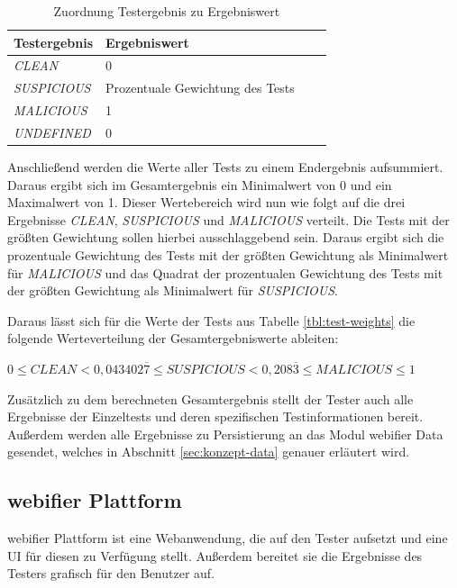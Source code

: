 \begin{table}[H]
\centering
\begin{tabular}{|l|l|l|l|}
\hline
\textbf{Testergebnis} & \textbf{Ergebniswert}\\\hline
\textit{CLEAN} & 0\\\hline
\textit{SUSPICIOUS} & Prozentuale Gewichtung des Tests\\\hline
\textit{MALICIOUS} & 1\\\hline
\textit{UNDEFINED} & 0\\\hline
\end{tabular}
\caption{Zuordnung Testergebnis zu Ergebniswert}
\label{tbl:test-values}
\end{table}

Anschließend werden die Werte aller Tests zu einem Endergebnis aufsummiert. Daraus ergibt sich im Gesamtergebnis ein Minimalwert von 0 und ein Maximalwert von 1. Dieser Wertebereich wird nun wie folgt auf die drei Ergebnisse \textit{CLEAN}, \textit{SUSPICIOUS} und \textit{MALICIOUS} verteilt. Die Tests mit der größten Gewichtung sollen hierbei ausschlaggebend sein. Daraus ergibt sich die prozentuale Gewichtung des Tests mit der größten Gewichtung als Minimalwert für \textit{MALICIOUS} und das Quadrat der prozentualen Gewichtung des Tests mit der größten Gewichtung als Minimalwert für \textit{SUSPICIOUS}.

Daraus lässt sich für die Werte der Tests aus Tabelle \ref{tbl:test-weights} die folgende Werteverteilung der Gesamtergebniswerte ableiten:

\begin{center}
$0 \leq CLEAN < 0,043402\overline{7} \leq SUSPICIOUS < 0,208\overline{3} \leq MALICIOUS \leq 1$
\end{center}

Zusätzlich zu dem berechneten Gesamtergebnis stellt der Tester auch alle Ergebnisse der Einzeltests und deren spezifischen Testinformationen bereit. Außerdem werden alle Ergebnisse zu Persistierung an das Modul webifier Data gesendet, welches in Abschnitt \ref{sec:konzept-data} genauer erläutert wird.

\subsection{webifier Plattform}

webifier Plattform ist eine Webanwendung, die auf den Tester aufsetzt und eine \ac{UI} für diesen zu Verfügung stellt. Außerdem bereitet sie die Ergebnisse des Testers grafisch für den Benutzer auf.

